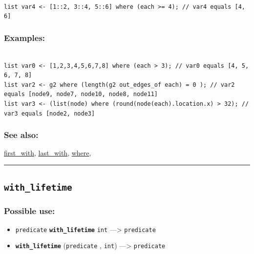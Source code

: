 \documentclass[]{book}
\providecommand{\tightlist}{%
  \setlength{\itemsep}{0pt}\setlength{\parskip}{0pt}}
\theoremstyle{definition}
\theoremstyle{definition}
\theoremstyle{definition}
\theoremstyle{remark}
\begin{document}
\begin{verbatim}
 
list var4 <- [1::2, 3::4, 5::6] where (each >= 4); // var4 equals [4, 6]
\end{verbatim}

\subsubsection{Examples:}\label{examples-382}

\begin{verbatim}
 
list var0 <- [1,2,3,4,5,6,7,8] where (each > 3); // var0 equals [4, 5, 6, 7, 8]  
list var2 <- g2 where (length(g2 out_edges_of each) = 0 ); // var2 equals [node9, node7, node10, node8, node11] 
list var3 <- (list(node) where (round(node(each).location.x) > 32); // var3 equals [node2, node3]
\end{verbatim}

\subsubsection{See also:}\label{see-also-220}

\href{operators-d-to-h.html\#first_with}{first\_with},
\href{operators-i-to-m.html\#last_with}{last\_with},
\href{operators-s-to-z.html\#where}{where},

\begin{center}\rule{0.5\linewidth}{\linethickness}\end{center}

\subsection{\texorpdfstring{\texttt{with\_lifetime}}{with\_lifetime}}\label{with_lifetime}

\subsubsection{Possible use:}\label{possible-use-556}

\begin{itemize}
\tightlist
\item
  \texttt{predicate} \textbf{\texttt{with\_lifetime}} \texttt{int}
  ---\textgreater{} \texttt{predicate}
\item
  \textbf{\texttt{with\_lifetime}} (\texttt{predicate} , \texttt{int})
  ---\textgreater{} \texttt{predicate}
\end{itemize}
\end{document}

